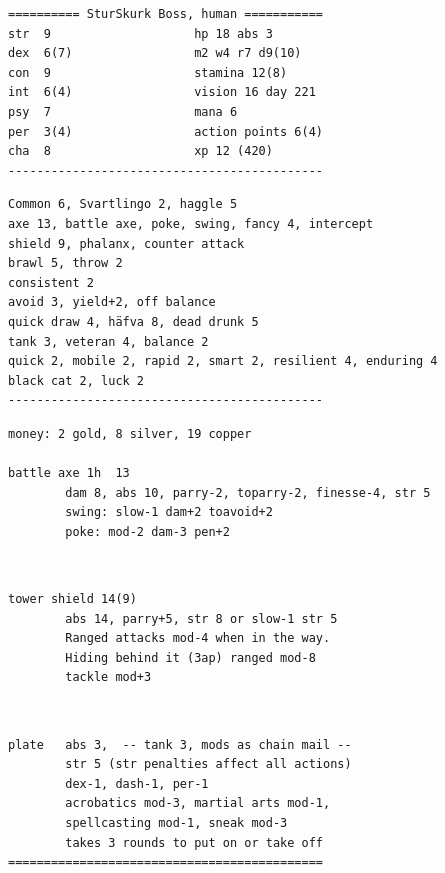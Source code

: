 \goodbreak \small \begin{samepage} \begin{verbatim}
========== SturSkurk Boss, human ===========
str  9                    hp 18 abs 3
dex  6(7)                 m2 w4 r7 d9(10)
con  9                    stamina 12(8)
int  6(4)                 vision 16 day 221
psy  7                    mana 6
per  3(4)                 action points 6(4)
cha  8                    xp 12 (420)
--------------------------------------------
\end{verbatim} \end{samepage} \goodbreak \begin{samepage} \begin{verbatim}
Common 6, Svartlingo 2, haggle 5
axe 13, battle axe, poke, swing, fancy 4, intercept
shield 9, phalanx, counter attack
brawl 5, throw 2
consistent 2
avoid 3, yield+2, off balance
quick draw 4, häfva 8, dead drunk 5
tank 3, veteran 4, balance 2
quick 2, mobile 2, rapid 2, smart 2, resilient 4, enduring 4
black cat 2, luck 2
--------------------------------------------
\end{verbatim} \end{samepage} \goodbreak \begin{samepage} \begin{verbatim}
money: 2 gold, 8 silver, 19 copper

battle axe 1h  13
        dam 8, abs 10, parry-2, toparry-2, finesse-4, str 5
        swing: slow-1 dam+2 toavoid+2
        poke: mod-2 dam-3 pen+2
\end{verbatim} \begin{samepage}   \   \goodbreak \end{samepage} \begin{verbatim}
tower shield 14(9)
        abs 14, parry+5, str 8 or slow-1 str 5
        Ranged attacks mod-4 when in the way.
        Hiding behind it (3ap) ranged mod-8
        tackle mod+3
\end{verbatim} \begin{samepage}   \   \goodbreak \end{samepage} \begin{verbatim}
plate   abs 3,  -- tank 3, mods as chain mail --
        str 5 (str penalties affect all actions)
        dex-1, dash-1, per-1
        acrobatics mod-3, martial arts mod-1, 
        spellcasting mod-1, sneak mod-3
        takes 3 rounds to put on or take off
============================================
\end{verbatim} \end{samepage} \normalsize

